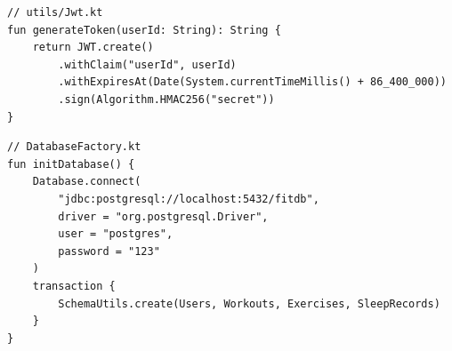 \begin{lstlisting}[caption={Бэкенд: JWT генерация}]
// utils/Jwt.kt
fun generateToken(userId: String): String {
    return JWT.create()
        .withClaim("userId", userId)
        .withExpiresAt(Date(System.currentTimeMillis() + 86_400_000))
        .sign(Algorithm.HMAC256("secret"))
}
\end{lstlisting}

\begin{lstlisting}[caption={Бэкенд: подключение к PostgreSQL}]
// DatabaseFactory.kt
fun initDatabase() {
    Database.connect(
        "jdbc:postgresql://localhost:5432/fitdb",
        driver = "org.postgresql.Driver",
        user = "postgres",
        password = "123"
    )
    transaction {
        SchemaUtils.create(Users, Workouts, Exercises, SleepRecords)
    }
}
\end{lstlisting}